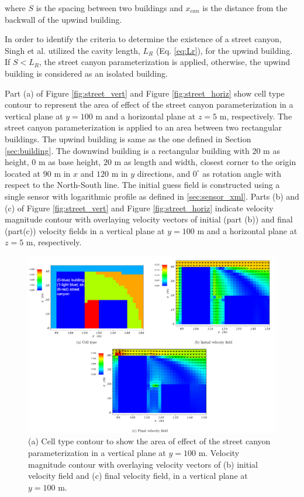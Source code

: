 where $S$ is the spacing between two buildings and $x_{can}$ is the distance from the backwall of the upwind building.

In order to identify the criteria to determine the existence of a street canyon, Singh et al. \cite{singh2008evaluation} utilized the cavity length, $L_R$ (Eq. \ref{eq:Lr}), for the upwind building. If $S < L_R$, the street canyon parameterization is applied, otherwise, the upwind building is considered as an isolated building.

Part (a) of Figure \ref{fig:street_vert} and Figure \ref{fig:street_horiz} show cell type contour to represent the area of effect of the street canyon parameterization in a vertical plane at $y=100$ m and a horizontal plane at $z=5$ m, respectively. The street canyon parameterization is applied to an area between two rectangular buildings. The upwind building is same as the one defined in Section \ref{sec:building}. The downwind building is a rectangular building with $20$ m as height, $0$ m as base height, $20$ m as length and width, closest corner to the origin located at $90$ m in $x$ and $120$ m in $y$ directions, and $0^{\circ}$ as rotation angle with respect to the North-South line. The initial guess field is constructed using a single sensor with logarithmic profile as defined in \ref{sec:sensor_xml}. Parts (b) and (c) of Figure \ref{fig:street_vert} and Figure \ref{fig:street_horiz} indicate velocity magnitude contour with overlaying velocity vectors of initial (part (b)) and final (part(c)) velocity fields in a vertical plane at $y=100$ m and a horizontal plane at $z=5$ m, respectively.

\begin{figure}[H]
    \centering
    \includegraphics[width=\textwidth]{Images/street_y_100_1.pdf}
    \caption{(a) Cell type contour to show the area of effect of the street canyon parameterization in a vertical plane at $y=100$ m. Velocity magnitude contour with overlaying velocity vectors of (b) initial velocity field and (c) final velocity field, in a vertical plane at $y=100$ m.}
\end{figure}

